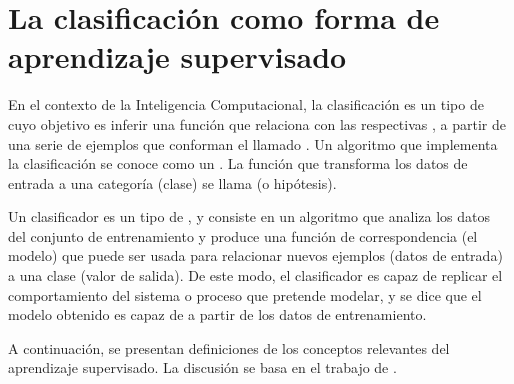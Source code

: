 %
%
%
\section{La clasificación como forma de aprendizaje supervisado}
%
En el contexto de la Inteligencia Computacional, la clasificación es
un tipo de  cuyo objetivo es
{inferir} una función que relaciona  con las
respectivas , a partir de una serie de ejemplos que
conforman el llamado . Un algoritmo que
implementa la clasificación se conoce como un .
La función que transforma los datos de entrada a una categoría
(clase) se llama  (o {hipótesis}).

Un clasificador es un tipo de , y consiste
en un algoritmo que analiza los datos del conjunto de entrenamiento
y produce una función de correspondencia (el modelo) que puede ser
usada para relacionar nuevos ejemplos (datos de entrada) a una clase
(valor de salida).
De este modo, el clasificador es capaz de replicar el comportamiento
del sistema o proceso que pretende modelar, y se dice que el modelo
obtenido es capaz de  a partir de los datos de
entrenamiento.

A continuación, se presentan definiciones de los conceptos
relevantes del aprendizaje supervisado. La discusión se
basa en el
trabajo de \citeauthor{glasmachers} \cite{glasmachers}.

